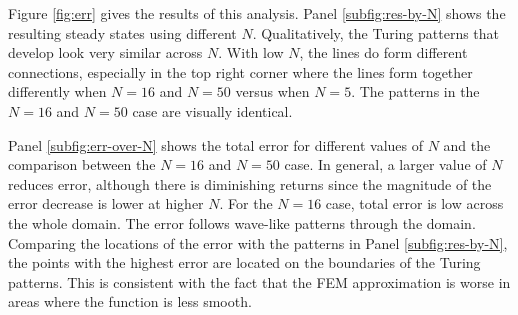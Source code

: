 Figure \ref{fig:err} gives the results of this analysis. Panel \ref{subfig:res-by-N} shows the resulting steady states using different $N$. Qualitatively, the Turing patterns that develop look very similar across $N$. With low $N$, the lines do form different connections, especially in the top right corner where the lines form together differently when $N = 16$ and $N = 50$ versus when $N = 5$. The patterns in the $N = 16$ and $N = 50$ case are visually identical.

Panel \ref{subfig:err-over-N} shows the total error for different values of $N$ and the comparison between the $N = 16$ and $N = 50$ case. In general, a larger value of $N$ reduces error, although there is diminishing returns since the magnitude of the error decrease is lower at higher $N$. For the $N = 16$ case, total error is low across the whole domain. The error follows wave-like patterns through the domain. Comparing the locations of the error with the patterns in Panel \ref{subfig:res-by-N}, the points with the highest error are located on the boundaries of the Turing patterns. This is consistent with the fact that the FEM approximation is worse in areas where the function is less smooth.
